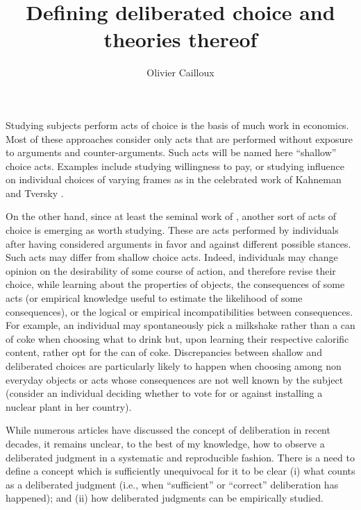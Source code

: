\documentclass[version=last, pagesize, twoside=off, bibliography=totoc, DIV=calc, fontsize=12pt, a4paper, french, english]{scrartcl}
\begin{document}
\title{Defining deliberated choice and theories thereof}
\author{Olivier Cailloux}
\date{}
\makeatletter
{}
\makeatother
\maketitle

Studying subjects perform acts of choice is the basis of much work in economics.
Most of these approaches consider only acts that are performed without exposure to arguments and counter-arguments. Such acts will be named here “shallow” choice acts. 
Examples include studying willingness to pay, or studying influence on individual choices of varying frames as in the celebrated work of Kahneman and Tversky \citep{bell_descriptive_1988, kahneman_thinking_2012}.

On the other hand, since at least the seminal work of \citet{fishkin_when_2011}, another sort of acts of choice is emerging as worth studying.
These are acts performed by individuals 
after having considered arguments in favor and against different possible stances. 
Such acts may differ from shallow choice acts. 
Indeed, individuals may change opinion on the desirability of some course of action, and therefore revise their choice, while learning about the properties of objects, the consequences of some acts (or empirical knowledge useful to estimate the likelihood of some consequences), or the logical or empirical incompatibilities between consequences. 
For example, an individual may spontaneously pick a milkshake rather than a can of coke when choosing what to drink but, upon learning their respective calorific content, rather opt for the can of coke.
Discrepancies between shallow and deliberated choices are particularly likely to happen when choosing among non everyday objects or acts whose consequences are not well known by the subject (consider an individual deciding whether to vote for or against installing a nuclear plant in her country). 

While numerous articles have discussed the concept of deliberation in recent decades, it remains unclear, to the best of my knowledge, how to observe a deliberated judgment in a systematic and reproducible fashion. 
There is a need to define a concept which is sufficiently unequivocal for it to be clear 
(i) what counts as a deliberated judgment (i.e., when “sufficient” \citep{meinard_justification_2020} or “correct” deliberation has happened); 
and (ii) how deliberated judgments can be empirically studied.
\end{document}
